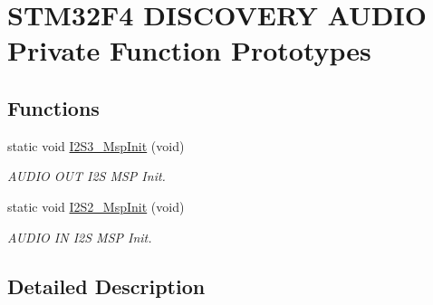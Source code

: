 \hypertarget{group___s_t_m32_f4___d_i_s_c_o_v_e_r_y___a_u_d_i_o___private___function___prototypes}{}\section{S\+T\+M32\+F4 D\+I\+S\+C\+O\+V\+E\+RY A\+U\+D\+IO Private Function Prototypes}
\label{group___s_t_m32_f4___d_i_s_c_o_v_e_r_y___a_u_d_i_o___private___function___prototypes}
\subsection*{Functions}
\begin{DoxyCompactItemize}
\item 
\mbox{\label{group___s_t_m32_f4___d_i_s_c_o_v_e_r_y___a_u_d_i_o___private___function___prototypes_gadf90b03c2c1377a086c85c4a4d55a05e}} 
static void \mbox{\hyperlink{group___s_t_m32_f4___d_i_s_c_o_v_e_r_y___a_u_d_i_o___private___function___prototypes_gadf90b03c2c1377a086c85c4a4d55a05e}{I2\+S3\+\_\+\+Msp\+Init}} (void)
\begin{DoxyCompactList}\small\item\em A\+U\+D\+IO O\+UT I2S M\+SP Init. \end{DoxyCompactList}\item 
\mbox{\label{group___s_t_m32_f4___d_i_s_c_o_v_e_r_y___a_u_d_i_o___private___function___prototypes_ga5101af8923312a07f4f16d47d11786f0}} 
static void \mbox{\hyperlink{group___s_t_m32_f4___d_i_s_c_o_v_e_r_y___a_u_d_i_o___private___function___prototypes_ga5101af8923312a07f4f16d47d11786f0}{I2\+S2\+\_\+\+Msp\+Init}} (void)
\begin{DoxyCompactList}\small\item\em A\+U\+D\+IO IN I2S M\+SP Init. \end{DoxyCompactList}\end{DoxyCompactItemize}


\subsection{Detailed Description}
